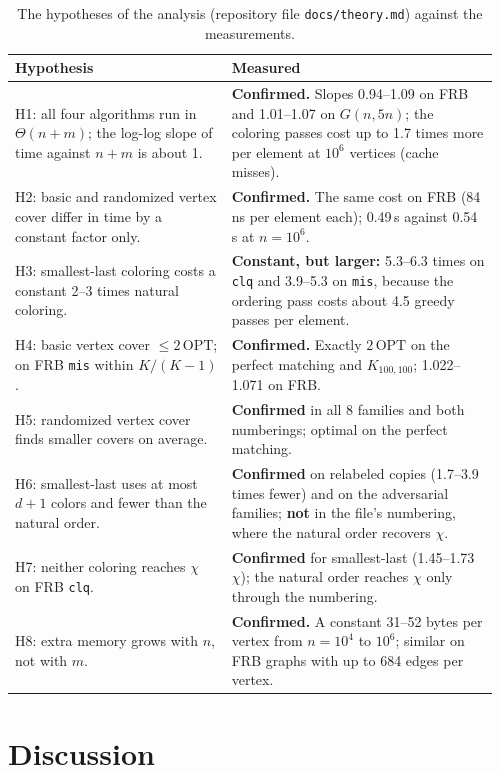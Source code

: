 \documentclass[acmsmall,nonacm]{acmart}
\newcommand{\code}[1]{\texttt{#1}}
\newcommand{\OPT}{\mathrm{OPT}}
\begin{document}
\begin{table}[t]
\caption{The hypotheses of the analysis (repository file \code{docs/theory.md}) against the measurements.}
\label{tab:hypotheses}
\footnotesize
\begin{tabular}{@{}p{0.43\linewidth}p{0.53\linewidth}@{}}
\toprule
Hypothesis & Measured \\
\midrule
H1: all four algorithms run in $\Theta(n+m)$; the log-log slope of time against $n+m$ is about 1. & \textbf{Confirmed.} Slopes 0.94--1.09 on FRB and 1.01--1.07 on $G(n,5n)$; the coloring passes cost up to 1.7 times more per element at $10^6$ vertices (cache misses). \\
H2: basic and randomized vertex cover differ in time by a constant factor only. & \textbf{Confirmed.} The same cost on FRB (84\,ns per element each); 0.49\,s against 0.54\,s at $n=10^6$. \\
H3: smallest-last coloring costs a constant 2--3 times natural coloring. & \textbf{Constant, but larger:} 5.3--6.3 times on \code{clq} and 3.9--5.3 on \code{mis}, because the ordering pass costs about 4.5 greedy passes per element. \\
H4: basic vertex cover $\le2\,\OPT$; on FRB \code{mis} within $K/(K-1)$. & \textbf{Confirmed.} Exactly $2\,\OPT$ on the perfect matching and $K_{100,100}$; 1.022--1.071 on FRB. \\
H5: randomized vertex cover finds smaller covers on average. & \textbf{Confirmed} in all 8 families and both numberings; optimal on the perfect matching. \\
H6: smallest-last uses at most $d+1$ colors and fewer than the natural order. & \textbf{Confirmed} on relabeled copies (1.7--3.9 times fewer) and on the adversarial families; \textbf{not} in the file's numbering, where the natural order recovers $\chi$. \\
H7: neither coloring reaches $\chi$ on FRB \code{clq}. & \textbf{Confirmed} for smallest-last (1.45--1.73\,$\chi$); the natural order reaches $\chi$ only through the numbering. \\
H8: extra memory grows with $n$, not with $m$. & \textbf{Confirmed.} A constant 31--52 bytes per vertex from $n=10^4$ to $10^6$; similar on FRB graphs with up to 684 edges per vertex. \\
\bottomrule
\end{tabular}
\end{table}

\section{Discussion}
\label{sec:discussion}
\end{document}
